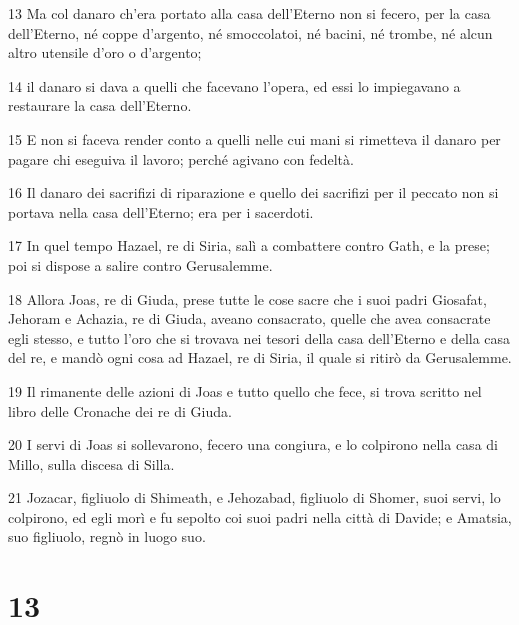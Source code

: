 \par 13 Ma col danaro ch'era portato alla casa dell'Eterno non si fecero, per la casa dell'Eterno, né coppe d'argento, né smoccolatoi, né bacini, né trombe, né alcun altro utensile d'oro o d'argento;
\par 14 il danaro si dava a quelli che facevano l'opera, ed essi lo impiegavano a restaurare la casa dell'Eterno.
\par 15 E non si faceva render conto a quelli nelle cui mani si rimetteva il danaro per pagare chi eseguiva il lavoro; perché agivano con fedeltà.
\par 16 Il danaro dei sacrifizi di riparazione e quello dei sacrifizi per il peccato non si portava nella casa dell'Eterno; era per i sacerdoti.
\par 17 In quel tempo Hazael, re di Siria, salì a combattere contro Gath, e la prese; poi si dispose a salire contro Gerusalemme.
\par 18 Allora Joas, re di Giuda, prese tutte le cose sacre che i suoi padri Giosafat, Jehoram e Achazia, re di Giuda, aveano consacrato, quelle che avea consacrate egli stesso, e tutto l'oro che si trovava nei tesori della casa dell'Eterno e della casa del re, e mandò ogni cosa ad Hazael, re di Siria, il quale si ritirò da Gerusalemme.
\par 19 Il rimanente delle azioni di Joas e tutto quello che fece, si trova scritto nel libro delle Cronache dei re di Giuda.
\par 20 I servi di Joas si sollevarono, fecero una congiura, e lo colpirono nella casa di Millo, sulla discesa di Silla.
\par 21 Jozacar, figliuolo di Shimeath, e Jehozabad, figliuolo di Shomer, suoi servi, lo colpirono, ed egli morì e fu sepolto coi suoi padri nella città di Davide; e Amatsia, suo figliuolo, regnò in luogo suo.

\chapter{13}

